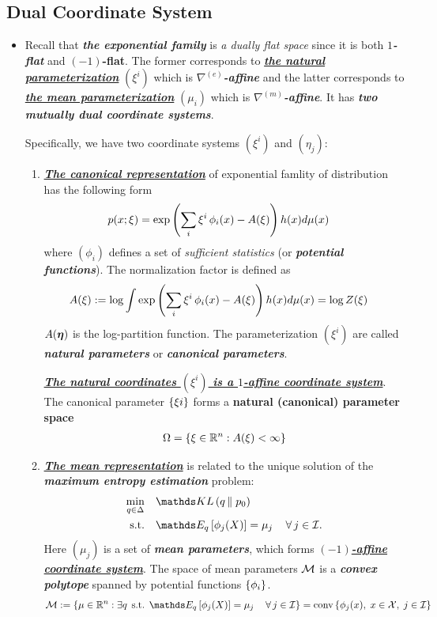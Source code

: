 \documentclass[11pt]{article}
\begin{document}
\subsection{Dual Coordinate System}
\begin{itemize}
\item \begin{remark}
Recall that \emph{\textbf{the exponential family}} is \emph{a dually flat space} since it is both \emph{\textbf{$1$-flat}} and \textbf{$(-1)$-flat}. The former corresponds to \underline{\emph{\textbf{the natural parameterization}}} $(\xi^i)$ which is \emph{\textbf{$\nabla^{(e)}$-affine}} and the latter corresponds to \underline{\emph{\textbf{the mean parameterization}}} $(\mu_i)$ which is \emph{\textbf{$\nabla^{(m)}$-affine}}.  It has \emph{\textbf{two mutually dual coordinate systems}}.


Specifically, we have two coordinate systems $(\xi^i)$ and $(\eta_j)$:
\begin{enumerate}
\item  \underline{\emph{\textbf{The canonical representation}}} of exponential famlity of distribution has the following form
\begin{align*}
p(x; \xi) &= \exp\left( \sum_{i} \xi^i\,\phi_i(x)  - A(\xi)\right)h(x) d\mu(x)
\end{align*} where $(\phi_i)$ defines a set of \emph{sufficient statistics} (or \emph{\textbf{potential functions}}). The normalization factor is defined as
\begin{align*}
 A(\xi) &:= \log \int \exp\left( \sum_{i} \xi^i\,\phi_i(x)  - A(\xi)\right)h(x) d\mu(x) = \log Z(\xi)
\end{align*} $A(\boldsymbol{\eta})$ is the log-partition function. The parameterization $(\xi^i)$ are called \textbf{\emph{natural parameters}}  or \emph{\textbf{canonical parameters}}. 

\underline{\emph{\textbf{The natural coordinates $(\xi^i)$ is a $1$-affine coordinate system}}}.  The canonical parameter $\left\{\xi{i}\right\}$ forms a \textbf{natural (canonical) parameter space}
\begin{align*}
\Omega = \left\{\xi \in {\mathbb R}^{n}:  A(\xi)   < \infty\right\}
\end{align*}

\item  \underline{\emph{\textbf{The mean representation}}} is related to the unique solution of the \textbf{\emph{maximum entropy estimation}} problem:
\begin{align*}
\min_{q \in \Delta}&\quad \kl{q}{p_{0}}\\
\text{s.t.}&\quad \E{q}{\phi_{j}(X)} = \mu_{j}\,\quad  \forall\, j \in \cI.
\end{align*}  Here $(\mu_{j})$ is a set of  \textbf{\emph{mean parameters}}, which forms \underline{\emph{\textbf{$(-1)$-affine coordinate system}}}. The space of mean parameters ${\mathcal M}$ is a \emph{\textbf{convex polytope}} spanned by potential functions $\left\{\phi_{i}\right\}$.
\begin{align*}
\cM &:= \set{\mu \in \bR^n: \exists q\,\; \text{s.t. } \E{q}{\phi_{j}(X)} = \mu_{j}\,\quad  \forall\, j \in \cI} = \text{conv}\set{\phi_{j}(x),\; x\in \cX, \;j \in \cI}  
\end{align*}


\end{enumerate}
\end{remark}
\end{itemize}
\end{document}
